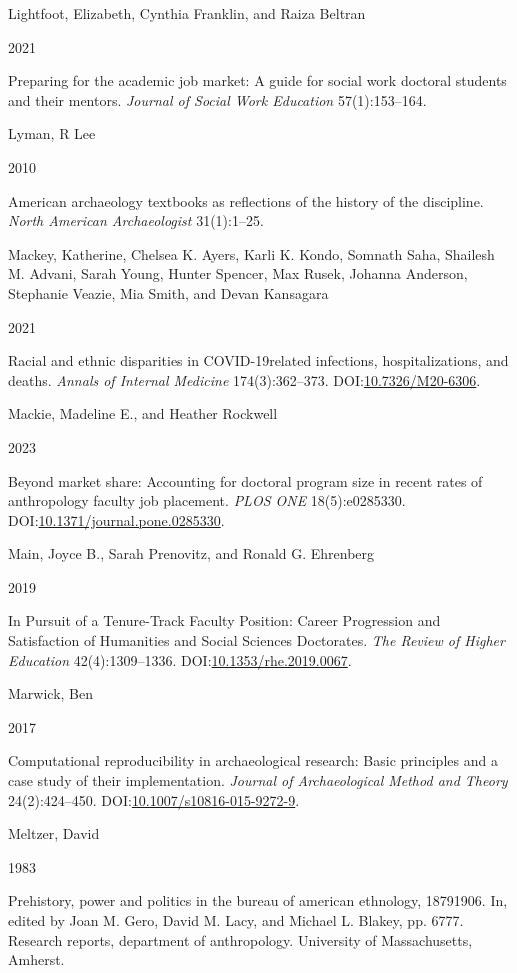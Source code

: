 \documentclass[
  12pt,
]{article}
\newlength{\cslhangindent}
\newlength{\csllabelwidth}
\newenvironment{CSLReferences}[2] %
 {\begin{list}{}{%
  \setlength{\itemindent}{0pt}
  \setlength{\leftmargin}{0pt}
  \setlength{\parsep}{0pt}
  \ifodd #1
   \setlength{\leftmargin}{\cslhangindent}
   \setlength{\itemindent}{-1\cslhangindent}
  \fi
  \setlength{\itemsep}{#2\baselineskip}}}
 {\end{list}}
\newcommand{\CSLBlock}[1]{\hfill\break\parbox[t]{\linewidth}{\strut\ignorespaces#1\strut}}
\newcommand{\CSLLeftMargin}[1]{\parbox[t]{\csllabelwidth}{\strut#1\strut}}
\newcommand{\CSLRightInline}[1]{\parbox[t]{\linewidth - \csllabelwidth}{\strut#1\strut}}
\begin{document}
\begin{CSLReferences}{0}{1}
\CSLBlock{Lightfoot, Elizabeth, Cynthia Franklin, and Raiza Beltran}
\CSLLeftMargin{ 2021}%
\CSLRightInline{Preparing for the academic job market: A guide for
social work doctoral students and their mentors. \emph{Journal of Social
Work Education} 57(1):153--164.}

\CSLBlock{Lyman, R Lee}
\CSLLeftMargin{ 2010}%
\CSLRightInline{American archaeology textbooks as reflections of the
history of the discipline. \emph{North American Archaeologist}
31(1):1--25.}

\CSLBlock{Mackey, Katherine, Chelsea K. Ayers, Karli K. Kondo, Somnath
Saha, Shailesh M. Advani, Sarah Young, Hunter Spencer, Max Rusek,
Johanna Anderson, Stephanie Veazie, Mia Smith, and Devan Kansagara}
\CSLLeftMargin{ 2021}%
\CSLRightInline{Racial and ethnic disparities in
COVID-19{\textendash}related infections, hospitalizations, and deaths.
\emph{Annals of Internal Medicine} 174(3):362--373.
DOI:\href{https://doi.org/10.7326/M20-6306}{10.7326/M20-6306}.}

\CSLBlock{Mackie, Madeline E., and Heather Rockwell}
\CSLLeftMargin{ 2023}%
\CSLRightInline{Beyond market share: Accounting for doctoral program
size in recent rates of anthropology faculty job placement. \emph{PLOS
ONE} 18(5):e0285330.
DOI:\href{https://doi.org/10.1371/journal.pone.0285330}{10.1371/journal.pone.0285330}.}

\CSLBlock{Main, Joyce B., Sarah Prenovitz, and Ronald G. Ehrenberg}
\CSLLeftMargin{ 2019}%
\CSLRightInline{In Pursuit of a Tenure-Track Faculty Position: Career
Progression and Satisfaction of Humanities and Social Sciences
Doctorates. \emph{The Review of Higher Education} 42(4):1309--1336.
DOI:\href{https://doi.org/10.1353/rhe.2019.0067}{10.1353/rhe.2019.0067}.}

\CSLBlock{Marwick, Ben}
\CSLLeftMargin{ 2017}%
\CSLRightInline{Computational reproducibility in archaeological
research: Basic principles and a case study of their implementation.
\emph{Journal of Archaeological Method and Theory} 24(2):424--450.
DOI:\href{https://doi.org/10.1007/s10816-015-9272-9}{10.1007/s10816-015-9272-9}.}

\CSLBlock{Meltzer, David}
\CSLLeftMargin{ 1983}%
\CSLRightInline{Prehistory, power and politics in the bureau of american
ethnology, 1879{\textendash}1906. In, edited by Joan M. Gero, David M.
Lacy, and Michael L. Blakey, pp. 6777. Research reports, department of
anthropology. University of Massachusetts, Amherst.}


\end{CSLReferences}
\end{document}
